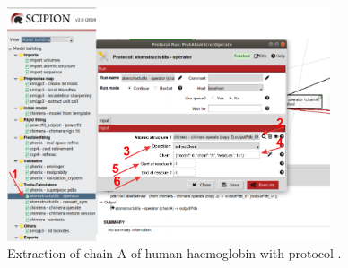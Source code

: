 \begin{itemize}
\begin{itemize}
     \\
     \\
     \\
    
        \begin{figure}[H]
            \centering 
            \captionsetup{width=.7\linewidth} 
            \includegraphics[width=0.85\textwidth]{Images/Fig47}
            \caption{Extraction of chain A of human haemoglobin  with protocol .}
            \label{fig:atomStructUtils_extractChain}
        \end{figure}
    

\end{itemize}
\end{itemize}
